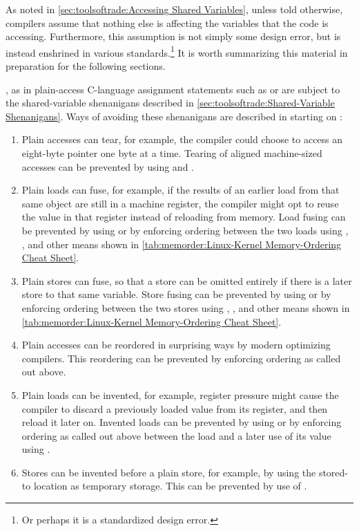 As noted in \cref{sec:toolsoftrade:Accessing Shared Variables},
unless told otherwise, compilers assume that nothing else
is affecting the variables that the code is accessing.
Furthermore, this assumption is not simply some design error, but is
instead enshrined in various standards.\footnote{
	Or perhaps it is a standardized design error.}
It is worth summarizing this material in preparation for the following
sections.

, as in plain-access C-language assignment statements such
as  or  are subject to the
shared-variable shenanigans described in
\cref{sec:toolsoftrade:Shared-Variable Shenanigans}.
Ways of avoiding these shenanigans are described in
starting on
:

\begin{enumerate}
\item	Plain accesses can tear, for example, the compiler could choose
	to access an eight-byte pointer one byte at a time.
	Tearing of aligned machine-sized accesses can be prevented by
	using  and .
\item	Plain loads can fuse, for example, if the results of an earlier
	load from that same object are still in a machine register,
	the compiler might opt to reuse the value in that register
	instead of reloading from memory.
	Load fusing can be prevented by using  or by
	enforcing ordering between the two loads using ,
	, and other means shown in
	\cref{tab:memorder:Linux-Kernel Memory-Ordering Cheat Sheet}.
\item	Plain stores can fuse, so that a store can be omitted entirely
	if there is a later store to that same variable.
	Store fusing can be prevented by using  or by
	enforcing ordering between the two stores using ,
	, and other means shown in
	\cref{tab:memorder:Linux-Kernel Memory-Ordering Cheat Sheet}.
\item	Plain accesses can be reordered in surprising ways by modern
	optimizing compilers.
	This reordering can be prevented by enforcing ordering as
	called out above.
\item	Plain loads can be invented, for example, register pressure might
	cause the compiler to discard a previously loaded value from
	its register, and then reload it later on.
	Invented loads can be prevented by using  or by
	enforcing ordering as called out above between the load and a
	later use of its value using .
\item	Stores can be invented before a plain store, for example, by
	using the stored-to location as temporary storage.
	This can be prevented by use of .
\end{enumerate}

